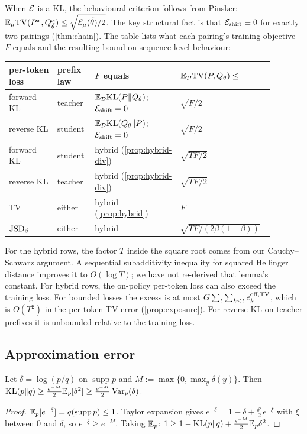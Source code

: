 \noindent
When $\mathcal{E}$ is a KL, the behavioural criterion follows from Pinsker:
$\mathbb{E}_\mu\mathrm{TV}(P^{x},Q^x_{\tilde\theta})\le\sqrt{\mathcal{E}_\mu(\tilde\theta)/2}$.
The key structural fact is that $\mathcal{E}_{\mathrm{shift}}\equiv0$ for exactly two pairings (\cref{thm:chain}). The
table lists what each pairing's training objective $F$ equals and the resulting bound on sequence-level
behaviour:
\begin{center}\small
\begin{tabular}{@{}p{0.17\linewidth}p{0.12\linewidth}p{0.3\linewidth}p{0.3\linewidth}@{}}
\toprule
per-token loss & prefix law & $F$ equals & $\mathbb{E}_{\mathcal{D}}\mathrm{TV}(P,Q_\theta)\le$\\\midrule
forward KL & teacher & $\mathbb{E}_{\mathcal{D}}\mathrm{KL}(P\|Q_\theta)$; $\mathcal{E}_{\mathrm{shift}}=0$ & $\sqrt{F/2}$\\
reverse KL & student & $\mathbb{E}_{\mathcal{D}}\mathrm{KL}(Q_\theta\|P)$; $\mathcal{E}_{\mathrm{shift}}=0$ & $\sqrt{F/2}$\\
forward KL & student & hybrid (\cref{prop:hybrid-div}) & $\sqrt{TF/2}$\\
reverse KL & teacher & hybrid (\cref{prop:hybrid-div}) & $\sqrt{TF/2}$\\
TV & either & hybrid (\cref{prop:hybrid}) & $F$\\
$\mathrm{JSD}_\beta$ & either & hybrid & $\sqrt{TF/(2\beta(1-\beta))}$\\\bottomrule
\end{tabular}
\end{center}
For the hybrid rows, the factor $T$ inside the square root comes from our Cauchy--Schwarz argument. A
sequential subadditivity inequality for squared Hellinger distance \citep{foster2021statistical}
improves it to $O(\log T)$; we have not re-derived that lemma's constant. For hybrid rows, the on-policy
per-token loss can also exceed the training loss. For bounded losses the excess is at most
$G\sum_t\sum_{k<t}e^{\mathrm{off},\mathrm{TV}}_k$, which is $O(T^2)$ in the per-token TV error (\cref{prop:exposure}). For reverse KL
on teacher prefixes it is unbounded relative to the training loss.

\subsection{Approximation error}\label{sec:approx}

\begin{lemma}\label{lem:logratio}
\Pv\Ck Let $\delta=\log(p/q)$ on $\operatorname{supp}p$ and $M:=\max\{0,\max_y\delta(y)\}$. Then
$\mathrm{KL}(p\|q)\ge\frac{e^{-M}}2\mathbb{E}_p[\delta^2]\ge\frac{e^{-M}}2\operatorname{Var}_p(\delta)$.
\end{lemma}
\begin{proof}
$\mathbb{E}_p[e^{-\delta}]=q(\operatorname{supp}p)\le1$. Taylor expansion gives $e^{-\delta}=1-\delta+\frac{\delta^2}2e^{-\xi}$
with $\xi$ between $0$ and $\delta$, so $e^{-\xi}\ge e^{-M}$. Taking $\mathbb{E}_p$:
$1\ge1-\mathrm{KL}(p\|q)+\frac{e^{-M}}2\mathbb{E}_p\delta^2$.
\end{proof}

